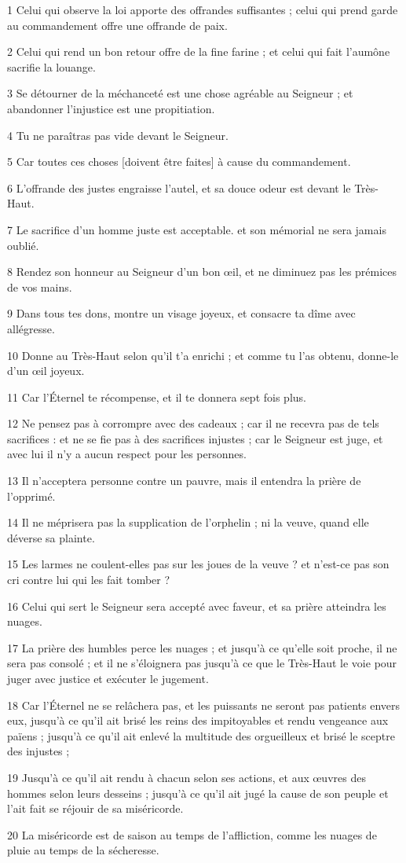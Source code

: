 \par 1 Celui qui observe la loi apporte des offrandes suffisantes ; celui qui prend garde au commandement offre une offrande de paix.
\par 2 Celui qui rend un bon retour offre de la fine farine ; et celui qui fait l'aumône sacrifie la louange.
\par 3 Se détourner de la méchanceté est une chose agréable au Seigneur ; et abandonner l'injustice est une propitiation.
\par 4 Tu ne paraîtras pas vide devant le Seigneur.
\par 5 Car toutes ces choses [doivent être faites] à cause du commandement.
\par 6 L'offrande des justes engraisse l'autel, et sa douce odeur est devant le Très-Haut.
\par 7 Le sacrifice d'un homme juste est acceptable. et son mémorial ne sera jamais oublié.
\par 8 Rendez son honneur au Seigneur d'un bon œil, et ne diminuez pas les prémices de vos mains.
\par 9 Dans tous tes dons, montre un visage joyeux, et consacre ta dîme avec allégresse.
\par 10 Donne au Très-Haut selon qu'il t'a enrichi ; et comme tu l'as obtenu, donne-le d'un œil joyeux.
\par 11 Car l'Éternel te récompense, et il te donnera sept fois plus.
\par 12 Ne pensez pas à corrompre avec des cadeaux ; car il ne recevra pas de tels sacrifices : et ne se fie pas à des sacrifices injustes ; car le Seigneur est juge, et avec lui il n'y a aucun respect pour les personnes.
\par 13 Il n'acceptera personne contre un pauvre, mais il entendra la prière de l'opprimé.
\par 14 Il ne méprisera pas la supplication de l'orphelin ; ni la veuve, quand elle déverse sa plainte.
\par 15 Les larmes ne coulent-elles pas sur les joues de la veuve ? et n'est-ce pas son cri contre lui qui les fait tomber ?
\par 16 Celui qui sert le Seigneur sera accepté avec faveur, et sa prière atteindra les nuages.
\par 17 La prière des humbles perce les nuages ​​; et jusqu'à ce qu'elle soit proche, il ne sera pas consolé ; et il ne s'éloignera pas jusqu'à ce que le Très-Haut le voie pour juger avec justice et exécuter le jugement.
\par 18 Car l'Éternel ne se relâchera pas, et les puissants ne seront pas patients envers eux, jusqu'à ce qu'il ait brisé les reins des impitoyables et rendu vengeance aux païens ; jusqu'à ce qu'il ait enlevé la multitude des orgueilleux et brisé le sceptre des injustes ;
\par 19 Jusqu'à ce qu'il ait rendu à chacun selon ses actions, et aux œuvres des hommes selon leurs desseins ; jusqu'à ce qu'il ait jugé la cause de son peuple et l'ait fait se réjouir de sa miséricorde.
\par 20 La miséricorde est de saison au temps de l'affliction, comme les nuages ​​de pluie au temps de la sécheresse.

